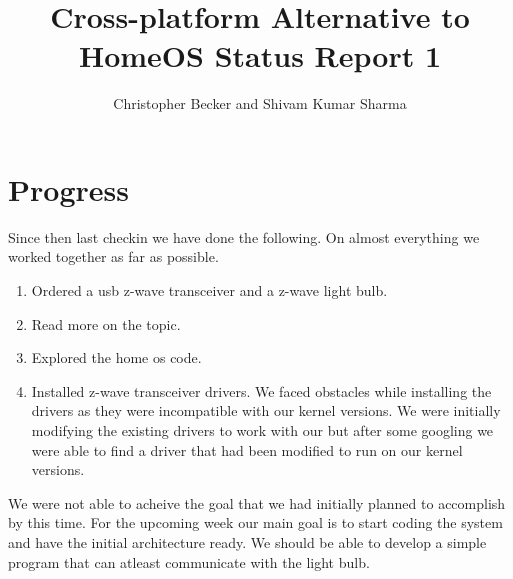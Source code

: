\documentclass[letterpaper,12pt]{article}
\title{Cross-platform Alternative to HomeOS Status Report 1}
\author{Christopher Becker and Shivam Kumar Sharma}
\begin{document}
\maketitle

\section*{Progress}
Since then last checkin we have done the following. On almost everything we worked together as far as possible.
\begin{enumerate}
 \item Ordered a usb z-wave transceiver and a z-wave light bulb.
 \item Read more on the topic.
 \item Explored the home os code.
 \item Installed z-wave transceiver drivers. We faced obstacles while installing the drivers as they were incompatible with our kernel versions. We were initially modifying the existing drivers to work with our but after some googling we were able to find a driver that had been modified to run on our kernel versions.
\end{enumerate}
We were not able to acheive the goal that we had initially planned to accomplish by this time.
For the upcoming week our main goal is to start coding the system and have the initial architecture ready. We should be able to develop a simple program that can atleast communicate with the light bulb.
\end{document}
